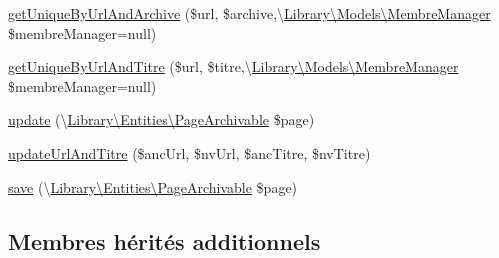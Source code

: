 \begin{DoxyCompactItemize}
\item 
\hyperlink{class_library_1_1_models_1_1_page_archivable_manager_a55b74423b698952d1a0192a6ea7aa1d1}{get\+Unique\+By\+Url\+And\+Archive} (\$url, \$archive,\textbackslash{}\hyperlink{class_library_1_1_models_1_1_membre_manager}{Library\textbackslash{}\+Models\textbackslash{}\+Membre\+Manager} \$membre\+Manager=null)
\item 
\hyperlink{class_library_1_1_models_1_1_page_archivable_manager_a968054a64e44b15546a87f57a5c5ba03}{get\+Unique\+By\+Url\+And\+Titre} (\$url, \$titre,\textbackslash{}\hyperlink{class_library_1_1_models_1_1_membre_manager}{Library\textbackslash{}\+Models\textbackslash{}\+Membre\+Manager} \$membre\+Manager=null)
\item 
\hyperlink{class_library_1_1_models_1_1_page_archivable_manager_a48f21ab940066848db8a223f032c78fd}{update} (\textbackslash{}\hyperlink{class_library_1_1_entities_1_1_page_archivable}{Library\textbackslash{}\+Entities\textbackslash{}\+Page\+Archivable} \$page)
\item 
\hyperlink{class_library_1_1_models_1_1_page_archivable_manager_a3dbc86813da702124a4d5d02154f3b52}{update\+Url\+And\+Titre} (\$anc\+Url, \$nv\+Url, \$anc\+Titre, \$nv\+Titre)
\item 
\hyperlink{class_library_1_1_models_1_1_page_archivable_manager_a5fb0a04b10ebd2a4ee47f396bfb9d9b5}{save} (\textbackslash{}\hyperlink{class_library_1_1_entities_1_1_page_archivable}{Library\textbackslash{}\+Entities\textbackslash{}\+Page\+Archivable} \$page)
\end{DoxyCompactItemize}
\subsection*{Membres hérités additionnels}



